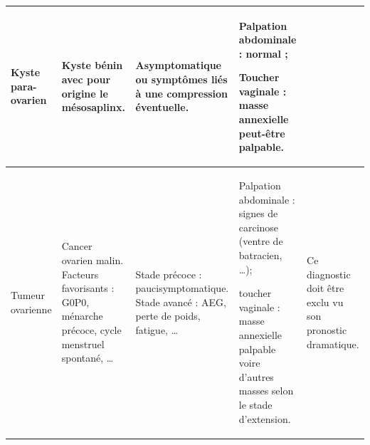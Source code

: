 \begin{landscape}
\begin{tabularx}{\linewidth}{|L{2.8cm}|L{4.5cm}|L{4.9cm}|L{6.4cm}|Y|}
  \hline
  Kyste para-ovarien &
  Kyste bénin avec pour origine le mésosaplinx. &
  Asymptomatique ou symptômes liés à une compression éventuelle. &
  \begin{tableitemize}
    \item Palpation abdominale : normal ;
    \item Toucher vaginale : masse annexielle peut-être palpable.
  \end{tableitemize} &
  \\
  \hline
  Tumeur ovarienne &
  Cancer ovarien malin. Facteurs favorisants : G0P0, ménarche précoce, cycle menstruel spontané, \ldots &
  Stade précoce : paucisymptomatique.\newline
  Stade avancé : AEG, perte de poids, fatigue, \ldots &
  \begin{tableitemize}
    \item Palpation abdominale : signes de carcinose (ventre de batracien, \ldots);
    \item toucher vaginale : masse annexielle palpable voire d'autres masses selon le stade d'extension.
  \end{tableitemize} &
  Ce diagnostic doit être exclu vu son pronostic dramatique. \\
  \hline
\end{tabularx}
\par
\endgroup
\end{landscape}
